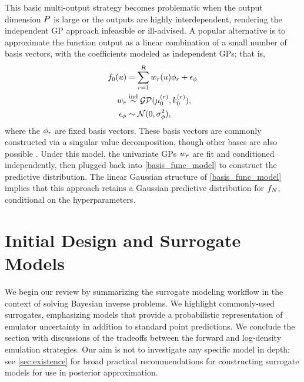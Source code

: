 \documentclass[12pt]{article}
\begin{document}
This basic multi-output strategy becomes problematic when the output dimension $\dimObs$ 
is large or the outputs are highly interdependent, rendering the independent GP approach infeasible or ill-advised.
A popular alternative is to approximate the function output as a linear combination of a small number
of basis vectors, with the coefficients modeled as independent GPs; that is, 
\begin{align}
\funcPrior(\Par) &= \sum_{\idxBasis=1}^{\dimBasis} \basisWeight_{\idxBasis}(\Par) \basisVec_{\idxBasis} + \noise_{\basisVec} \label{basis_func_model} \\
\basisWeight_{\idxBasis} &\overset{\textrm{ind}}{\sim} \GP(\emMean[0]{(\idxBasis)}, \emKer[0]{(\idxBasis)}), \label{basis_func_GPs} \\
 \noise_{\basisVec} &\sim \Gaussian(0, \sigma^2_{\basisVec}), \label{basis_func_noise}
\end{align}
where the $\basisVec_{\idxBasis}$ are fixed basis vectors.
These basis vectors are commonly constructed via a singular value decomposition, though other 
bases are also possible \citep{HigdonBasis, emulate_functional_output, functionValuedModels, PODemulation}.
Under this model, the univariate GPs $\basisWeight_{\idxBasis}$ are fit and conditioned independently, then 
plugged back into \cref{basis_func_model} to construct the predictive distribution. The linear Gaussian 
structure of \cref{basis_func_model} implies that this approach retains a Gaussian predictive distribution
for $\funcEm[\Ndesign]$, conditional on the hyperparameters.

\section{Initial Design and Surrogate Models}
We begin our review by summarizing the surrogate modeling workflow in the context of solving
Bayesian inverse problems. We highlight commonly-used surrogates, emphasizing
models that provide a probabilistic representation of emulator uncertainty in addition to 
standard point predictions. We conclude the section with discussions of the tradeoffs
between the forward and log-density emulation strategies. Our aim is not to investigate any specific 
model in depth; see \cref{sec:existence} for broad practical recommendations for 
constructing surrogate models for use in posterior approximation.
\end{document}
